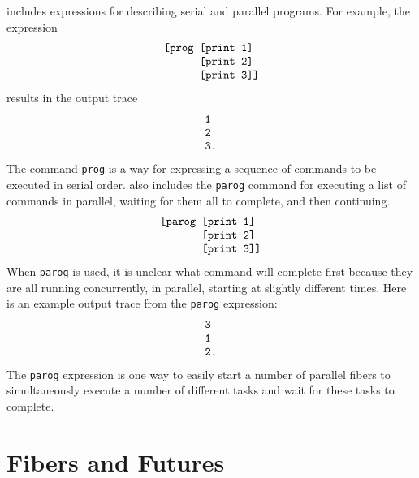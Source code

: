 {\SALS} includes expressions for describing serial and parallel
programs.  For example, the expression
\begin{equation*}
\begin{array}{l}
\text{\tt [prog [print 1]} \\
\text{\tt ~~~~~~[print 2]} \\
\text{\tt ~~~~~~[print 3]]}
\end{array}
\end{equation*}
results in the output trace
\begin{equation*}
\begin{array}{l}
\text{\tt 1} \\
\text{\tt 2} \\
\text{\tt 3.}
\end{array}
\end{equation*}
The command {\tt prog} is a way for expressing a sequence of commands
to be executed in serial order.  {\SALS} also includes the {\tt parog}
command for executing a list of commands in parallel, waiting for them
all to complete, and then continuing.
\begin{equation*}
\begin{array}{l}
\text{\tt [parog [print 1]} \\
\text{\tt ~~~~~~~[print 2]} \\
\text{\tt ~~~~~~~[print 3]]}
\end{array}
\end{equation*}
When {\tt parog} is used, it is unclear what command will complete
first because they are all running concurrently, in parallel, starting
at slightly different times.  Here is an example output trace from the
{\tt parog} expression:
\begin{equation*}
\begin{array}{l}
\text{\tt 3} \\
\text{\tt 1} \\
\text{\tt 2.}
\end{array}
\end{equation*}
The {\tt parog} expression is one way to easily start a number of
parallel fibers to simultaneously execute a number of different tasks
and wait for these tasks to complete.

\section{Fibers and Futures}

